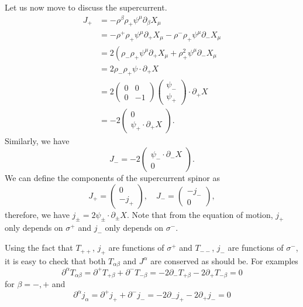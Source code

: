 \documentclass[graybox,envcountchap,sectrefs]{svmono}
\begin{document}
Let us now move to discuss the supercurrent.
\begin{equation}
\begin{aligned}
J_{+} &=-\rho^{\beta} \rho_{+} \psi^{\mu} \partial_{\beta} X_{\mu} \\
&=-\rho^{+} \rho_{+} \psi^{\mu} \partial_{+} X_{\mu}-\rho^{-} \rho_{+} \psi^{\mu} \partial_{-} X_{\mu} \\
&=2\left(\rho_{-} \rho_{+} \psi^{\mu} \partial_{+} X_{\mu}+\rho_{+}^{2} \psi^{\mu} \partial_{-} X_{\mu}\right.\\
&=2 \rho_{-} \rho_{+} \psi \cdot \partial_{+} X \\
&=2\left(\begin{array}{cc}
0 & 0 \\
0 & -1
\end{array}\right)\left(\begin{array}{c}
\psi_{-} \\
\psi_{+}
\end{array}\right) \cdot \partial_{+} X \\
&=-2\left(\begin{array}{c}
0 \\
\psi_{+} \cdot \partial_{+} X
\end{array}\right).
\end{aligned}
\end{equation}
Similarly, we have
\begin{equation}
J_{-}=-2\left(\begin{array}{c}
\psi_{-} \cdot \partial_{-} X \\
0
\end{array}\right).
\end{equation}
We can define the components of the supercurrent spinor as
\begin{equation}
J_{+}=\left( \begin{array}{cc}
 	0\\
 	-j_{+}
 \end{array}
\right),\quad 
J_{-}=\left( \begin{array}{cc}
 	-j_{-}\\
 	0
 \end{array}
\right),
\end{equation}
therefore, we have $j_{\pm}=2\psi_{\pm} \cdot \partial_{\pm} X$. Note that from the equation of motion, $j_{+}$ only depends on $\sigma^+$ and $j_{-}$ only depends on $\sigma^{-}$.

Using the fact that $T_{++}$, $j_{+}$ are functions of $\sigma^+$ and $T_{--}$, $j_{-}$ are functions of $\sigma^-$, it is easy to check that both $T_{\alpha \beta}$ and $J^{\alpha}$ are conserved as should be. For examples
\begin{equation}
\partial^{\alpha} T_{\alpha \beta}=\partial^{+} T_{+\beta}+\partial^{-} T_{-\beta}=-2 \partial_{-} T_{+\beta}-2 \partial_{+} T_{-\beta}=0
\end{equation}
for $\beta=-,+$ and
\begin{equation}
\partial^{\alpha} j_{\alpha}=\partial^{+} j_{+}+\partial^{-} j_{-}=-2 \partial_{-} j_{+}-2 \partial_{+} j_{-}=0
\end{equation}
\end{document}
